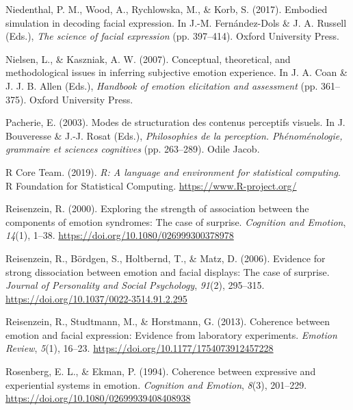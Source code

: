 \documentclass[
  english,
  man]{apa7}
\newlength{\cslhangindent}
\newenvironment{cslreferences}%
  {\setlength{\parindent}{0pt}%
  \everypar{\setlength{\hangindent}{\cslhangindent}}\ignorespaces}%
  {\par}
\begin{document}
\begin{cslreferences}
\leavevmode\hypertarget{ref-niedenthal2017embodied}{}%
Niedenthal, P. M., Wood, A., Rychlowska, M., \& Korb, S. (2017). Embodied simulation in decoding facial expression. In J.-M. Fernández-Dols \& J. A. Russell (Eds.), \emph{The science of facial expression} (pp. 397--414). Oxford University Press.

\leavevmode\hypertarget{ref-nielsen2007conceptual}{}%
Nielsen, L., \& Kaszniak, A. W. (2007). Conceptual, theoretical, and methodological issues in inferring subjective emotion experience. In J. A. Coan \& J. J. B. Allen (Eds.), \emph{Handbook of emotion elicitation and assessment} (pp. 361--375). Oxford University Press.

\leavevmode\hypertarget{ref-pacherie2003modes}{}%
Pacherie, E. (2003). Modes de structuration des contenus perceptifs visuels. In J. Bouveresse \& J.-J. Rosat (Eds.), \emph{Philosophies de la perception. Phénoménologie, grammaire et sciences cognitives} (pp. 263--289). Odile Jacob.

\leavevmode\hypertarget{ref-R-base}{}%
R Core Team. (2019). \emph{R: A language and environment for statistical computing}. R Foundation for Statistical Computing. \url{https://www.R-project.org/}

\leavevmode\hypertarget{ref-reisenzein2000exploring}{}%
Reisenzein, R. (2000). Exploring the strength of association between the components of emotion syndromes: The case of surprise. \emph{Cognition and Emotion}, \emph{14}(1), 1--38. \url{https://doi.org/10.1080/026999300378978}

\leavevmode\hypertarget{ref-reisenzein2006evidence}{}%
Reisenzein, R., Bördgen, S., Holtbernd, T., \& Matz, D. (2006). Evidence for strong dissociation between emotion and facial displays: The case of surprise. \emph{Journal of Personality and Social Psychology}, \emph{91}(2), 295--315. \url{https://doi.org/10.1037/0022-3514.91.2.295}

\leavevmode\hypertarget{ref-reisenzein2013coherence}{}%
Reisenzein, R., Studtmann, M., \& Horstmann, G. (2013). Coherence between emotion and facial expression: Evidence from laboratory experiments. \emph{Emotion Review}, \emph{5}(1), 16--23. \url{https://doi.org/10.1177/1754073912457228}

\leavevmode\hypertarget{ref-rosenberg1994coherence}{}%
Rosenberg, E. L., \& Ekman, P. (1994). Coherence between expressive and experiential systems in emotion. \emph{Cognition and Emotion}, \emph{8}(3), 201--229. \url{https://doi.org/10.1080/02699939408408938}


\end{cslreferences}
\end{document}
